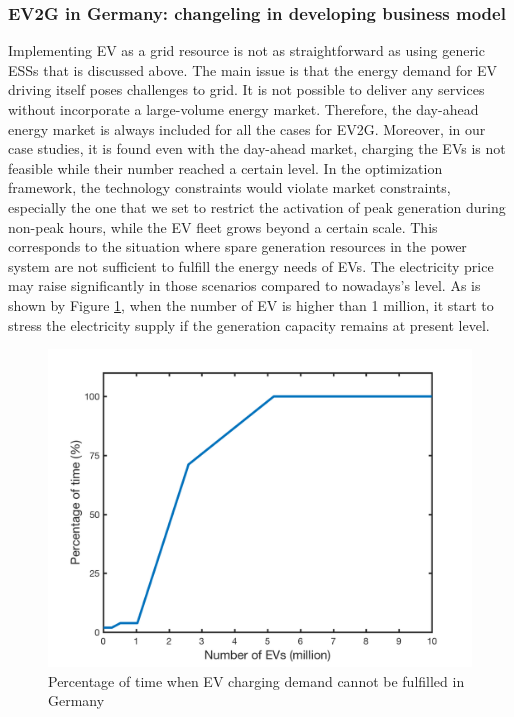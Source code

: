 \subsubsection{EV2G in Germany: changeling in developing business model}
Implementing EV as a grid resource is not as straightforward as using generic ESSs that is discussed above. The main issue is that the energy demand for EV driving itself poses challenges to grid. It is not possible to deliver any services without incorporate a large-volume energy market. Therefore, the day-ahead energy market is always included for all the cases for EV2G. Moreover, in our case studies, it is found even with the day-ahead market, charging the EVs is not feasible while their number reached a certain level. In the optimization framework, the technology constraints would violate market constraints, especially the one that we set to restrict the activation of peak generation during non-peak hours, while the EV fleet grows beyond a certain scale. This corresponds to the situation where spare generation resources in the power system are not sufficient  to fulfill the energy needs of EVs. The electricity price may raise significantly in those scenarios compared to nowadays's level. As is shown by Figure \ref{fig:EV_nan_percentageg}, when the number of EV is higher than 1 million, it start to stress the electricity supply if the generation capacity remains at present level. 
\begin{figure}[h!]
	\centering
	\includegraphics[width=0.95\linewidth]{Figures/EV_nan_percentage}
	\caption{Percentage of time when EV charging demand cannot be fulfilled in Germany}
	\label{fig:EV_nan_percentageg}
\end{figure}

